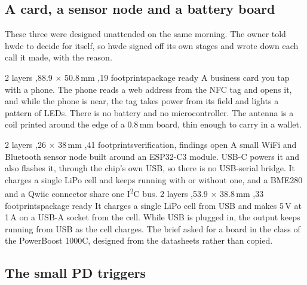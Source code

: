 \newpage

\subsection{A card, a sensor node and a battery board}

These three were designed unattended on the same morning. The owner told hwde
to decide for itself, so hwde signed off its own stages and wrote down each
call it made, with the reason.

\setlength{\boardh}{6cm}
%
{2 layers \sep 88.9 $\times$ 50.8\,mm \sep 19 footprints}{package ready}%
{A business card you tap with a phone. The phone reads a web address from the
NFC tag and opens it, and while the phone is near, the tag takes power from
its field and lights a pattern of LEDs. There is no battery and no
microcontroller. The antenna is a coil printed around the edge of a 0.8\,mm
board, thin enough to carry in a wallet.}
\setlength{\boardh}{9cm}

\boardpair
{%
{2 layers \sep 26 $\times$ 38\,mm \sep 41 footprints}{verification, findings open}%
{A small WiFi and Bluetooth sensor node built around an ESP32-C3 module. USB-C
powers it and also flashes it, through the chip's own USB, so there is no
USB-serial bridge. It charges a single LiPo cell and keeps running with or
without one, and a BME280 and a Qwiic connector share one
I\textsuperscript{2}C bus.}}
{%
{2 layers \sep 53.9 $\times$ 38.8\,mm \sep 33 footprints}{package ready}%
{It charges a single LiPo cell from USB and makes 5\,V at 1\,A on a USB-A
socket from the cell. While USB is plugged in, the output keeps running from
USB as the cell charges. The brief asked for a board in the class of the
PowerBoost 1000C, designed from the datasheets rather than copied.}}

\newpage

\subsection{The small PD triggers}

